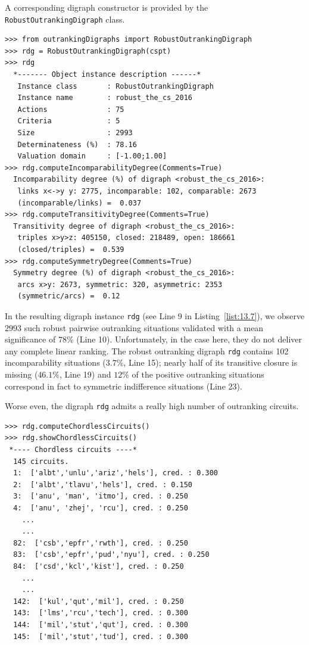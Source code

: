 A corresponding digraph constructor is provided by the \texttt{RobustOutranking\-Digraph} class.
\begin{lstlisting}[caption={Computing the robust outranking digraph},label=list:13.7]
>>> from outrankingDigraphs import RobustOutrankingDigraph	     
>>> rdg = RobustOutrankingDigraph(cspt)
>>> rdg
  *------- Object instance description ------*
   Instance class       : RobustOutrankingDigraph
   Instance name        : robust_the_cs_2016
   Actions              : 75
   Criteria             : 5
   Size                 : 2993
   Determinateness (%)  : 78.16
   Valuation domain     : [-1.00;1.00]
>>> rdg.computeIncomparabilityDegree(Comments=True)
  Incomparability degree (%) of digraph <robust_the_cs_2016>:
   links x<->y y: 2775, incomparable: 102, comparable: 2673
   (incomparable/links) =  0.037
>>> rdg.computeTransitivityDegree(Comments=True)
  Transitivity degree of digraph <robust_the_cs_2016>:
   triples x>y>z: 405150, closed: 218489, open: 186661
   (closed/triples) =  0.539
>>> rdg.computeSymmetryDegree(Comments=True)
  Symmetry degree (%) of digraph <robust_the_cs_2016>:
   arcs x>y: 2673, symmetric: 320, asymmetric: 2353
   (symmetric/arcs) =  0.12
\end{lstlisting}

In the resulting digraph instance \texttt{rdg} (see Line 9 in Listing~\vref{list:13.7}), we observe $2993$ such robust pairwise outranking situations validated with a mean significance of $78\%$ (Line 10). Unfortunately, in the case here, they do not deliver any complete linear ranking. The robust outranking digraph \texttt{rdg} contains 102 incomparability situations ($3.7\%$, Line 15); nearly half of its transitive closure is missing ($46.1\%$, Line 19) and $12\%$ of the positive outranking situations correspond in fact to symmetric indifference situations (Line 23).

Worse even, the digraph \texttt{rdg} admits a really high number of outranking circuits.
\begin{lstlisting}[caption={Inspecting outranking circuits},label=list:13.8]
>>> rdg.computeChordlessCircuits()
>>> rdg.showChordlessCircuits()
 *---- Chordless circuits ----*
  145 circuits.
  1:  ['albt','unlu','ariz','hels'], cred. : 0.300
  2:  ['albt','tlavu','hels'], cred. : 0.150
  3:  ['anu', 'man', 'itmo'], cred. : 0.250
  4:  ['anu', 'zhej', 'rcu'], cred. : 0.250
    ...
    ...
  82:  ['csb','epfr','rwth'], cred. : 0.250
  83:  ['csb','epfr','pud','nyu'], cred. : 0.250
  84:  ['csd','kcl','kist'], cred. : 0.250
    ...
    ...
  142:  ['kul','qut','mil'], cred. : 0.250
  143:  ['lms','rcu','tech'], cred. : 0.300
  144:  ['mil','stut','qut'], cred. : 0.300
  145:  ['mil','stut','tud'], cred. : 0.300
\end{lstlisting}

